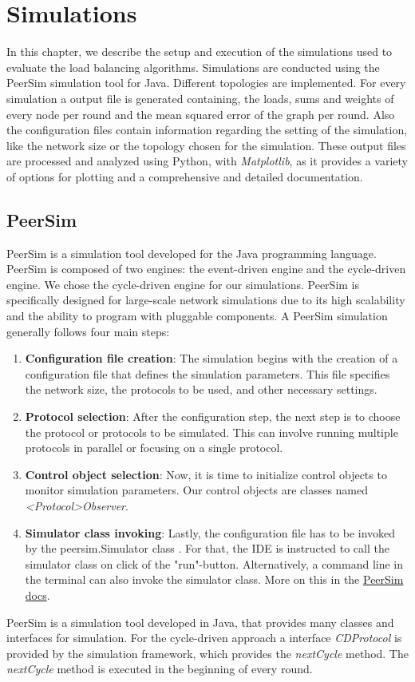 \chapter{Simulations}\label{chap:simulations}
In this chapter, we describe the setup and execution of the simulations used to evaluate the load balancing algorithms. Simulations are conducted using the PeerSim simulation tool for Java. Different topologies are implemented. For every simulation a output file is generated containing, the loads, sums and weights of every node per round and the mean squared error of the graph per round. Also the configuration files contain information regarding the setting of the simulation, like the network size or the topology chosen for the simulation. These output files are processed and analyzed using Python, with \textit{Matplotlib}, as it provides a variety of options for plotting and a comprehensive and detailed documentation.

\section{PeerSim}
PeerSim is a simulation tool developed for the Java programming language. PeerSim is composed of two engines: the event-driven engine and the cycle-driven engine. We chose the cycle-driven engine for our simulations. PeerSim is specifically designed for large-scale network simulations due to its high scalability and the ability to program with pluggable components. A PeerSim simulation generally follows four main steps:
\begin{enumerate}
    \item \textbf{Configuration file creation}: The simulation begins with the creation of a configuration file that defines the simulation parameters. This file specifies the network size, the protocols to be used, and other necessary settings.
    \item \textbf{Protocol selection}: After the configuration step, the next step is to choose the protocol or protocols to be simulated. This can involve running multiple protocols in parallel or focusing on a single protocol.
    \item \textbf{Control object selection}: Now, it is time to initialize control objects to monitor simulation parameters. Our control objects are classes named \textit{<Protocol>Observer}.
    \item \textbf{Simulator class invoking}: Lastly, the configuration file has to be invoked by the peersim.Simulator class \cite{peersimdocs}. For that, the IDE is instructed to call the simulator class on click of the "run"-button. Alternatively, a command line in the terminal can also invoke the simulator class. More on this in the \hyperref[https://peersim.sourceforge.net/]{PeerSim docs}.
\end{enumerate}
PeerSim is a simulation tool developed in Java, that provides many classes and interfaces for simulation. For the cycle-driven approach a interface \textit{CDProtocol} is provided by the simulation framework, which provides the \textit{nextCycle} method. The \textit{nextCycle} method is executed in the beginning of every round.

